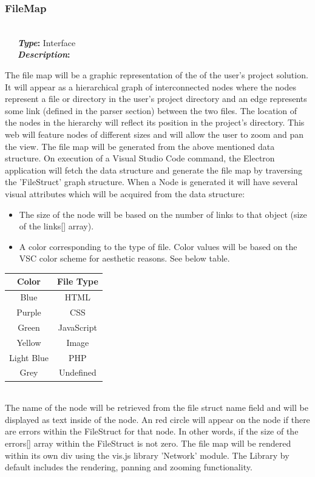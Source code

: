 \documentclass[letterpaper,10pt,titlepage,draftclsnofoot,onecolumn,onesided] {IEEEtran}
\newcommand{\bolditin}[2]{
	\-\ \-\ \-\ \textbf{\textit{#1}#2}
}
\begin{document}
\subsubsection{FileMap}
\hfill \\
\bolditin{Type}{:} Interface \\
\bolditin{Description}{:} 
The file map will be a graphic representation of the of the user's project solution. 
It will appear as a hierarchical graph of interconnected nodes where the nodes represent a file or directory in the user's project directory and an edge represents some link (defined in the parser section) between the two files.
The location of the nodes in the hierarchy will reflect its position in the project's directory.
This web will feature nodes of different sizes and will allow the user to zoom and pan the view.
The file map will be generated from the above mentioned data structure. 
On execution of a Visual Studio Code command, the Electron application will fetch the data structure and generate the file map by traversing the 'FileStruct' graph structure.
When a Node is generated it will have several visual attributes which will be acquired from the data structure:
\begin{itemize}
	\item The size of the node will be based on the number of links to that object (size of the links[] array). 
	\item A color corresponding to the type of file. Color values will be based on the VSC color scheme for aesthetic reasons. 
	See below table.
\end{itemize}
\begin{tabular}{| c | c |}
	\hline
	Color & File Type\\
	\hline
	Blue & HTML\\
	Purple & CSS\\
	Green & JavaScript\\
	Yellow & Image\\
	Light Blue & PHP\\
	Grey & Undefined\\
	\hline
\end{tabular}
\\
	
The name of the node will be retrieved from the file struct name field and will be displayed as text inside of the node.
An red circle will appear on the node if there are errors within the FileStruct for that node. In other words, if the size of the errors[] array within the FileStruct is not zero.
The file map will be rendered within its own div using the vis.js library 'Network' module. 
The Library by default includes the rendering, panning and zooming functionality. \cite{visjs}
	
\end{document}
